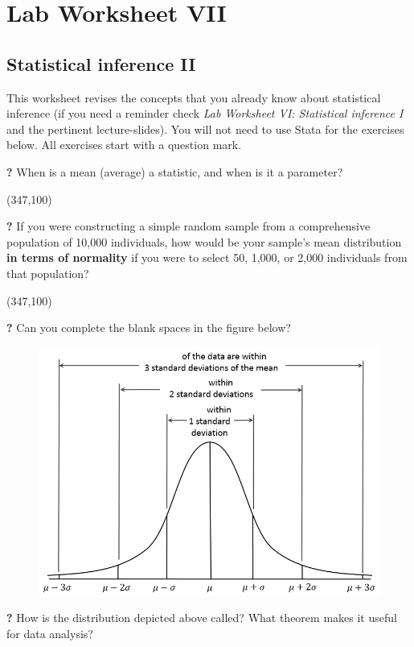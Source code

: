 \documentclass{article}
\newcommand{\forceindent}{\leavevmode{\parindent=2em\indent}}
\begin{document}
\section*{\hfil Lab Worksheet VII \hfil}
\subsection*{Statistical inference II}

This worksheet revises the concepts that you already know about statistical inference (if you need a reminder check \textit{Lab Worksheet VI: Statistical inference I} and the pertinent lecture-slides). You will not need to use Stata for the exercises below. All exercises start with a question mark. 

\forceindent \textbf{?} When is a mean (average) a statistic, and when is it a parameter?

\framebox(347,100){}

\forceindent \textbf{?} If you were constructing a simple random sample from a comprehensive population of 10,000 individuals, how would be your sample's mean distribution \textbf{in terms of normality} if you were to select 50, 1,000, or 2,000 individuals from that population?

\framebox(347,100){}

\forceindent \textbf{?} Can you complete the blank spaces in the figure below?

\begin{figure}[H]
	\includegraphics[width=\linewidth]{Gaussian_distribution.jpg}
\end{figure}

\forceindent \textbf{?} How is the distribution depicted above called? What theorem makes it useful for data analysis?
\end{document}
